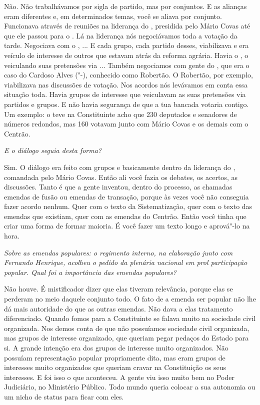Não. Não trabalhávamos por sigla de partido, mas por
conjuntos. E as alianças eram diferentes e, em determinados temas, você
se aliava por conjunto. Funcionava através de reuniões na liderança do
, presidida pelo Mário Covas até que ele passou para o . Lá na
liderança nós negociávamos toda a votação da tarde. Negociava com o ,
... E cada grupo, cada partido desses, viabilizava e era veículo de
interesse de outros que estavam atrás da reforma agrária. Havia o , o
 veiculando suas pretensões via ... Também negociamos com gente do
, que era o caso do Cardoso Alves ("-), conhecido como
Robertão. O Robertão, por exemplo, viabilizava nas discussões de
votação. Nos acordos nós levávamos em conta essa situação toda. Havia
grupos de interesse que veiculavam as suas pretensões via partidos e
grupos. E não havia segurança de que a tua bancada votaria contigo. Um
exemplo: o  teve na Constituinte acho que 230 deputados e senadores
de números redondos, mas 160 votavam junto com Mário Covas e os demais
com o Centrão.

\medskip

\noindent\emph{E o diálogo seguia desta forma?}

Sim. O diálogo era feito com grupos e basicamente dentro
da liderança do , comandada pelo Mário Covas. Então ali você fazia
os debates, os acertos, as discussões. Tanto é que a gente inventou,
dentro do processo, as chamadas emendas de fusão ou emendas de
transação, porque às vezes você não conseguia fazer acordo nenhum. Quer
com o texto da Sistematização, quer com o texto das emendas que
existiam, quer com as emendas do Centrão. Então você tinha que criar uma
forma de formar maioria. É você fazer um texto longo e aprová"-lo na
hora.

\medskip

\noindent\emph{Sobre as emendas populares: o regimento interno, na elaboração
junto com Fernando Henrique, acolheu o pedido da plenária nacional em
prol participação popular. Qual foi a importância das emendas
populares?}

Não houve. É mistificador dizer que elas tiveram
relevância, porque elas se perderam no meio daquele conjunto todo. O
fato de a emenda ser popular não lhe dá mais autoridade do que as outras
emendas. Não dava a elas tratamento diferenciado. Quando fomos para a
Constituinte se falava muito na sociedade civil organizada. Nos demos
conta de que não possuíamos sociedade civil organizada, mas grupos de
interesse organizado, que queriam pegar pedaços do Estado para si. A
grande intenção era dos grupos de interesse muito organizados. Não
possuíam representação popular propriamente dita, mas eram grupos de
interesses muito organizados que queriam cravar na Constituição os seus
interesses. E foi isso o que aconteceu. A gente viu isso muito bem no
Poder Judiciário, no Ministério Público. Todo mundo queria colocar a sua
autonomia ou um nicho de status para ficar com eles.


